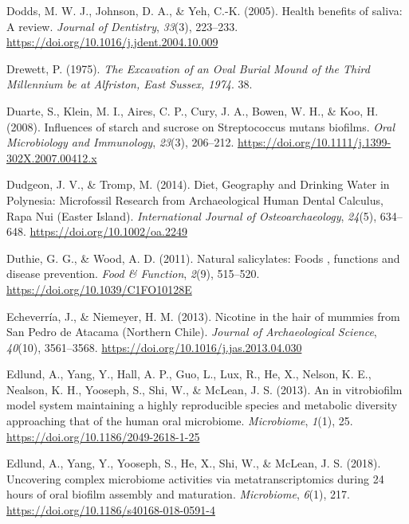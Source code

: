 \documentclass[
  letterpaper,
]{book}
\newlength{\cslhangindent}
\newlength{\cslentryspacingunit} %
\newenvironment{CSLReferences}[2] %
 {%
  \setlength{\parindent}{0pt}
  \ifodd #1
  \let\oldpar\par
  \def\par{\hangindent=\cslhangindent\oldpar}
  \fi
  \setlength{\parskip}{#2\cslentryspacingunit}
 }%
 {}
\begin{document}
\begin{CSLReferences}{1}{0}
\leavevmode{}%
Dodds, M. W. J., Johnson, D. A., \& Yeh, C.-K. (2005). Health benefits
of saliva: A review. \emph{Journal of Dentistry}, \emph{33}(3),
223--233. \url{https://doi.org/10.1016/j.jdent.2004.10.009}

\leavevmode{}%
Drewett, P. (1975). \emph{The {Excavation} of an {Oval Burial Mound} of
the {Third Millennium} be at {Alfriston}, {East Sussex}, 1974}. 38.

\leavevmode{}%
Duarte, S., Klein, M. I., Aires, C. P., Cury, J. A., Bowen, W. H., \&
Koo, H. (2008). Influences of starch and sucrose on {Streptococcus}
mutans biofilms. \emph{Oral Microbiology and Immunology}, \emph{23}(3),
206--212. \url{https://doi.org/10.1111/j.1399-302X.2007.00412.x}

\leavevmode{}%
Dudgeon, J. V., \& Tromp, M. (2014). Diet, {Geography} and {Drinking
Water} in {Polynesia}: {Microfossil Research} from {Archaeological Human
Dental Calculus}, {Rapa Nui} ({Easter Island}). \emph{International
Journal of Osteoarchaeology}, \emph{24}(5), 634--648.
\url{https://doi.org/10.1002/oa.2249}

\leavevmode{}%
Duthie, G. G., \& Wood, A. D. (2011). Natural salicylates: Foods ,
functions and disease prevention. \emph{Food \& Function}, \emph{2}(9),
515--520. \url{https://doi.org/10.1039/C1FO10128E}

\leavevmode{}%
Echeverría, J., \& Niemeyer, H. M. (2013). Nicotine in the hair of
mummies from {San Pedro} de {Atacama} ({Northern Chile}). \emph{Journal
of Archaeological Science}, \emph{40}(10), 3561--3568.
\url{https://doi.org/10.1016/j.jas.2013.04.030}

\leavevmode{}%
Edlund, A., Yang, Y., Hall, A. P., Guo, L., Lux, R., He, X., Nelson, K.
E., Nealson, K. H., Yooseph, S., Shi, W., \& McLean, J. S. (2013). An in
vitrobiofilm model system maintaining a highly reproducible species and
metabolic diversity approaching that of the human oral microbiome.
\emph{Microbiome}, \emph{1}(1), 25.
\url{https://doi.org/10.1186/2049-2618-1-25}

\leavevmode{}%
Edlund, A., Yang, Y., Yooseph, S., He, X., Shi, W., \& McLean, J. S.
(2018). Uncovering complex microbiome activities via metatranscriptomics
during 24 hours of oral biofilm assembly and maturation.
\emph{Microbiome}, \emph{6}(1), 217.
\url{https://doi.org/10.1186/s40168-018-0591-4}


\end{CSLReferences}
\end{document}
